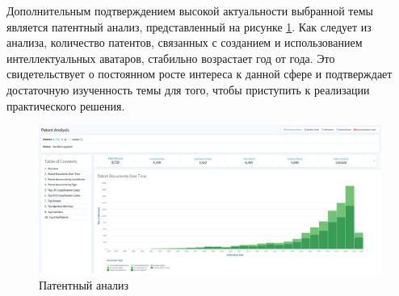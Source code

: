 Дополнительным подтверждением высокой актуальности выбранной темы является патентный анализ, представленный на рисунке \ref{fig:patent-analysis}. Как следует из анализа, количество патентов, связанных с созданием и использованием интеллектуальных аватаров, стабильно возрастает год от года. Это свидетельствует о постоянном росте интереса к данной сфере и подтверждает достаточную изученность темы для того, чтобы приступить к реализации практического решения.

\begin{figure}[h!]
    \centering
    \includegraphics[width=1.0\linewidth]{images/patent-analysis.png}
    \caption{Патентный анализ}
    \label{fig:patent-analysis}
\end{figure}